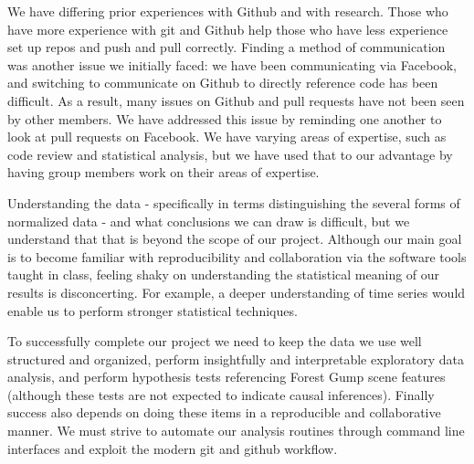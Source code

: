 \documentclass[11pt]{article}
\begin{document}
We have differing prior experiences with Github and with research.  Those who
have more experience with git and Github help those who have less experience
set up repos and push and pull correctly.  Finding a method of communication
was another issue we initially faced: we have been communicating via Facebook,
and switching to communicate on Github to directly reference code has been
difficult.  As a result, many issues on Github and pull requests have not been
seen by other members.  We have addressed this issue by reminding one another
to look at pull requests on Facebook. We have varying areas of expertise, such
as code review and statistical analysis, but we have used that to our
advantage by having group members work on their areas of expertise.

Understanding the data - specifically in terms distinguishing the several
forms of normalized data - and what conclusions we can draw is difficult, but
we understand that that is beyond the scope of our project. Although our main
goal is to become familiar with reproducibility and collaboration via the
software tools taught in class, feeling shaky on understanding the statistical
meaning of our results is disconcerting. For example, a deeper understanding
of time series would enable us to perform stronger statistical techniques.

To successfully complete our project we need to keep the data we use well
structured and organized, perform insightfully and interpretable exploratory
data analysis, and perform hypothesis tests referencing Forest Gump scene
features (although these tests are not expected to indicate causal
inferences). Finally success also depends on doing these items in a
reproducible and collaborative manner. We must strive to automate our analysis
routines through command line interfaces and exploit the modern git and github
workflow.



\end{document}

